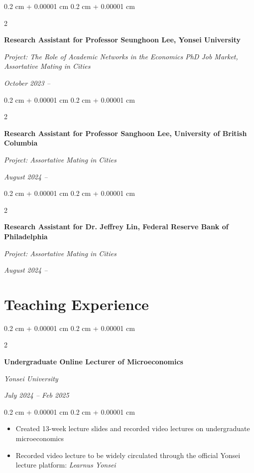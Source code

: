 \documentclass[10pt, letterpaper]{article}
\newenvironment{highlights}{
	\begin{itemize}[
		topsep=0.10 cm,
		parsep=0.10 cm,
		partopsep=0pt,
		itemsep=0pt,
		leftmargin=0.4 cm + 10pt
		]
	}{
	\end{itemize}
} %
\newenvironment{onecolentry}{
	\begin{adjustwidth}{
			0.2 cm + 0.00001 cm
		}{
			0.2 cm + 0.00001 cm
		}
	}{
	\end{adjustwidth}
} %
\newenvironment{twocolentry}[2][]{
	\onecolentry
	\def\secondColumn{#2}
	\setcolumnwidth{\fill, 4.5 cm}
	\begin{paracol}{2}
	}{
		\switchcolumn \raggedleft \secondColumn
	\end{paracol}
	\endonecolentry
} %
\begin{document}
			\begin{twocolentry}{
			\textit{October 2023 –}    
			
			\textit{}}
		\textbf{Research Assistant for Professor Seunghoon Lee, Yonsei University}
		
		\textit{Project: The Role of Academic Networks in the Economics PhD Job Market, Assortative Mating in Cities }
	\end{twocolentry}
	
\vspace{12pt}
				\begin{twocolentry}{
			\textit{August 2024 –}    
			
			\textit{}}
		\textbf{Research Assistant for Professor Sanghoon Lee, University of British Columbia}
		
		\textit{Project: Assortative Mating in Cities}
	\end{twocolentry}
	
\vspace{12pt}

					\begin{twocolentry}{
			\textit{August 2024 –}    
			
			\textit{}}
		\textbf{Research Assistant for Dr. Jeffrey Lin, Federal Reserve Bank of Philadelphia}
		
		\textit{Project: Assortative Mating in Cities}
	\end{twocolentry}
	
	
	
	\section{Teaching Experience}
		\begin{twocolentry}{
			\textit{July 2024 – Feb 2025}    
			
			\textit{}}
		\textbf{Undergraduate Online Lecturer of Microeconomics}
		
		\textit{Yonsei University}
	\end{twocolentry}
	
	\vspace{0.10 cm}
	\begin{onecolentry}
		\begin{highlights}
			\item Created 13-week lecture slides and recorded video lectures on undergraduate microeconomics
			\item Recorded video lecture to be widely circulated through the official Yonsei lecture platform: \textit{Learnus Yonsei}
		\end{highlights}
	\end{onecolentry}
	
\end{document}
